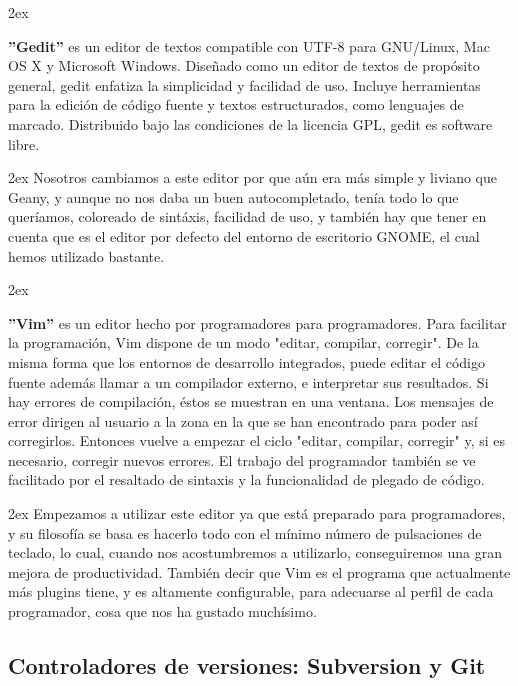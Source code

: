 \documentclass[12pt,a4paper]{report}
\begin{document}
\parskip 2ex

\textbf{''Gedit''} es un editor de textos compatible con UTF-8 para GNU/Linux,
Mac OS X y Microsoft Windows. Diseñado como un editor de textos de propósito
general, gedit enfatiza la simplicidad y facilidad de uso. Incluye herramientas
para la edición de código fuente y textos estructurados, como lenguajes de
marcado. Distribuido bajo las condiciones de la licencia GPL, gedit es software
libre. 

\parskip 2ex
Nosotros cambiamos a este editor por que aún era más simple y liviano que Geany,
y aunque no nos daba un buen autocompletado, tenía todo lo que queríamos,
coloreado de sintáxis, facilidad de uso, y también hay que tener en cuenta que
es el editor por defecto del entorno de escritorio GNOME, el cual hemos
utilizado bastante. 

\parskip 2ex

\textbf{''Vim''} es un editor hecho por programadores para programadores. Para
facilitar la programación, Vim dispone de un modo "editar, compilar, corregir".
De la misma forma que los entornos de desarrollo integrados, puede editar el
código fuente además llamar a un compilador externo, e interpretar sus
resultados. Si hay errores de compilación, éstos se muestran en una ventana. Los
mensajes de error dirigen al usuario a la zona en la que se han encontrado para
poder así corregirlos. Entonces vuelve a empezar el ciclo "editar, compilar,
corregir" y, si es necesario, corregir nuevos errores. El trabajo del
programador también se ve facilitado por el resaltado de sintaxis y la
funcionalidad de plegado de código.

\parskip 2ex Empezamos a utilizar este editor ya que está preparado para
programadores, y su filosofía se basa es hacerlo todo con el mínimo número de
pulsaciones de teclado, lo cual, cuando nos acostumbremos a utilizarlo,
conseguiremos una gran mejora de productividad. También decir que Vim es el
programa que actualmente más plugins tiene, y es altamente configurable, para
adecuarse al perfil de cada programador, cosa que nos ha gustado muchísimo. 


\subsection{Controladores de versiones: Subversion y Git}
\end{document}
